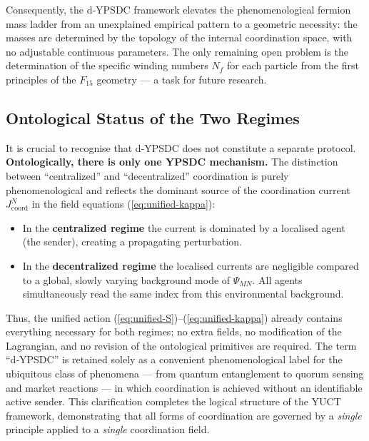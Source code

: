 \documentclass[12pt,a4paper]{article}
\begin{document}
	Consequently, the d‑YPSDC framework elevates the phenomenological fermion mass
	ladder from an unexplained empirical pattern to a geometric necessity: the masses
	are determined by the topology of the internal coordination space, with no
	adjustable continuous parameters. The only remaining open problem is the
	determination of the specific winding numbers $N_f$ for each particle from the
	first principles of the $F_{15}$ geometry — a task for future research.
	
	\subsection{Ontological Status of the Two Regimes}
	\label{subsec:ontological-status}
	
	It is crucial to recognise that d‑YPSDC does not constitute a separate protocol.
	\textbf{Ontologically, there is only one YPSDC mechanism.} The distinction between
	``centralized'' and ``decentralized'' coordination is purely phenomenological and
	reflects the dominant source of the coordination current
	\(J^{N}_{\mathrm{coord}}\) in the field equations (\ref{eq:unified-kappa}):
	
	\begin{itemize}[leftmargin=*]
		\item In the \textbf{centralized regime} the current is dominated by a localised
		agent (the sender), creating a propagating perturbation.
		\item In the \textbf{decentralized regime} the localised currents are negligible
		compared to a global, slowly varying background mode of \(\Psi_{MN}\). All agents
		simultaneously read the same index from this environmental background.
	\end{itemize}
	
	Thus, the unified action (\ref{eq:unified-S})--(\ref{eq:unified-kappa}) already
	contains everything necessary for both regimes; no extra fields, no modification
	of the Lagrangian, and no revision of the ontological primitives are required.
	The term ``d‑YPSDC'' is retained solely as a convenient phenomenological label
	for the ubiquitous class of phenomena — from quantum entanglement to quorum sensing
	and market reactions — in which coordination is achieved without an identifiable
	active sender. This clarification completes the logical structure of the YUCT
	framework, demonstrating that all forms of coordination are governed by a
	\emph{single} principle applied to a \emph{single} coordination field.
	
\end{document}
